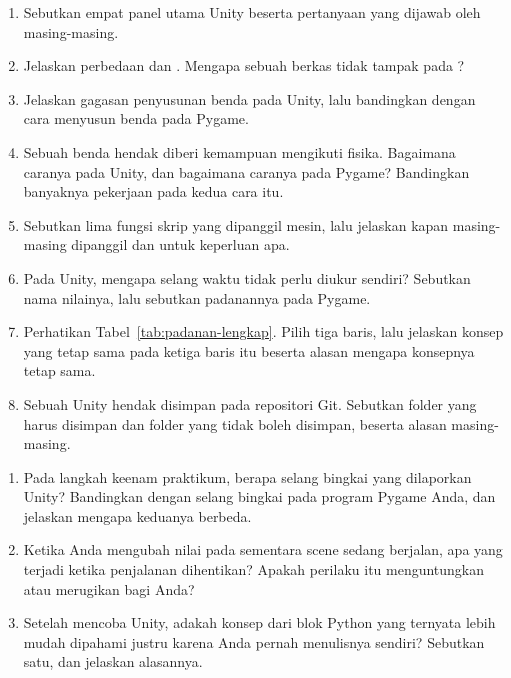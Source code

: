 
\begin{enumerate}
  \item Sebutkan empat panel utama Unity beserta pertanyaan yang dijawab oleh
        masing-masing.

  \item Jelaskan perbedaan  dan .
        Mengapa sebuah berkas  tidak tampak pada
        ?

  \item Jelaskan gagasan penyusunan benda pada Unity, lalu bandingkan dengan
        cara menyusun benda pada Pygame.

  \item Sebuah benda hendak diberi kemampuan mengikuti fisika. Bagaimana
        caranya pada Unity, dan bagaimana caranya pada Pygame? Bandingkan
        banyaknya pekerjaan pada kedua cara itu.

  \item Sebutkan lima fungsi skrip yang dipanggil mesin, lalu jelaskan kapan
        masing-masing dipanggil dan untuk keperluan apa.

  \item Pada Unity, mengapa selang waktu tidak perlu diukur sendiri? Sebutkan
        nama nilainya, lalu sebutkan padanannya pada Pygame.

  \item Perhatikan Tabel~\ref{tab:padanan-lengkap}. Pilih tiga baris, lalu
        jelaskan konsep yang tetap sama pada ketiga baris itu beserta alasan
        mengapa konsepnya tetap sama.

  \item Sebuah  Unity hendak disimpan pada repositori Git.
        Sebutkan folder yang harus disimpan dan folder yang tidak boleh
        disimpan, beserta alasan masing-masing.
\end{enumerate}

\begin{refleksibox}
\begin{enumerate}
  \item Pada langkah keenam praktikum, berapa selang bingkai yang dilaporkan
        Unity? Bandingkan dengan selang bingkai pada program Pygame Anda, dan
        jelaskan mengapa keduanya berbeda.

  \item Ketika Anda mengubah nilai pada  sementara scene
        sedang berjalan, apa yang terjadi ketika penjalanan dihentikan? Apakah
        perilaku itu menguntungkan atau merugikan bagi Anda?

  \item Setelah mencoba Unity, adakah konsep dari blok Python yang ternyata
        lebih mudah dipahami justru karena Anda pernah menulisnya sendiri?
        Sebutkan satu, dan jelaskan alasannya.
\end{enumerate}
\end{refleksibox}
